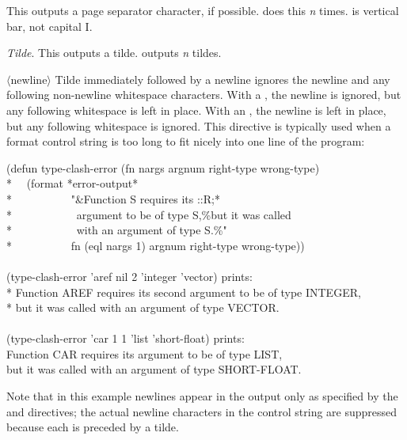 \begin{flushdesc}
\item[\cd{{\Xtilde}|}]
This outputs a page separator character, if possible.
 does this
\emph{n} times.  \cd{|} is vertical bar, not capital I.

\item[\cd{{\Xtilde}{\Xtilde}}]
\emph{Tilde}.
This outputs a tilde.   outputs \emph{n} tildes.

\item[\cd{{\Xtilde}}$\langle$newline$\rangle$]
Tilde immediately followed by a newline ignores the newline
and any following non-newline whitespace characters.
With a \cd{:}, the newline
is ignored, but any following whitespace is left in place.
With an \cd{{\Xatsign}}, the newline
is left in place, but any following whitespace is ignored.
This directive is typically used when a format control string is too long
to fit nicely into one line of the program:
\begin{lisp}
(defun type-clash-error (fn nargs argnum right-type wrong-type) \\*
~~(format *error-output* \\*
~~~~~~~~~~"{\Xtilde}\&Function {\Xtilde}S requires its {\Xtilde}:{\Xlbracket}{\Xtilde}:R{\Xtilde};{\Xtilde}*{\Xtilde}{\Xrbracket} {\Xtilde} \\*
~~~~~~~~~~~argument to be of type {\Xtilde}S,{\Xtilde}\%but it was called {\Xtilde} \\*
~~~~~~~~~~~with an argument of type {\Xtilde}S.{\Xtilde}\%" \\*
~~~~~~~~~~fn (eql nargs 1) argnum right-type wrong-type)) \\
 \\
(type-clash-error 'aref nil 2 'integer 'vector)  \textrm{prints}: \\*
Function AREF requires its second argument to be of type INTEGER, \\*
but it was called with an argument of type VECTOR. \\
 \\
(type-clash-error 'car 1 1 'list 'short-float)  \textrm{prints}: \\
Function CAR requires its argument to be of type LIST, \\
but it was called with an argument of type SHORT-FLOAT.
\end{lisp}
Note that in this example newlines appear in the output only as specified
by the \cd{{\Xtilde}\&} and \cd{{\Xtilde}\%} directives; the actual newline characters
in the control string are suppressed because each is preceded by a tilde.


\end{flushdesc}
